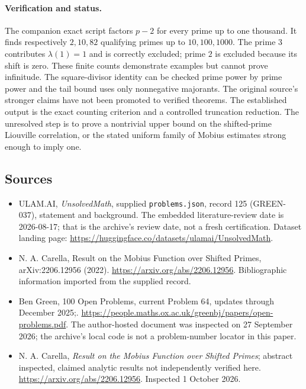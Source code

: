 \documentclass[11pt,a4paper]{article}
\begin{document}
\paragraph{Verification and status.}
The companion exact script factors $p-2$ for every prime up to one thousand. It finds respectively $2,10,82$ qualifying primes up to $10,100,1000$. The prime $3$ contributes $\lambda(1)=1$ and is correctly excluded; prime $2$ is excluded because its shift is zero. These finite counts demonstrate examples but cannot prove infinitude. The square-divisor identity can be checked prime power by prime power and the tail bound uses only nonnegative majorants. The original source's stronger claims have not been promoted to verified theorems. The established output is the exact counting criterion and a controlled truncation reduction. The unresolved step is to prove a nontrivial upper bound on the shifted-prime Liouville correlation, or the stated uniform family of Mobius estimates strong enough to imply one.

\subsection{Sources}

{\small

\begin{itemize}

\item[\hypertarget{source:125:1}{S1}] ULAM.AI, \emph{UnsolvedMath}, supplied \texttt{problems.json}, record 125 (GREEN-037), statement and background. The embedded literature-review date is 2026-08-17; that is the archive’s review date, not a fresh certification. Dataset landing page: \url{https://huggingface.co/datasets/ulamai/UnsolvedMath}.

\item[\hypertarget{source:125:2}{S2}] N. A. Carella, Result on the Mobius Function over Shifted Primes, arXiv:2206.12956 (2022). \url{https://arxiv.org/abs/2206.12956}. Bibliographic information imported from the supplied record.

\item[\hypertarget{source:125:3}{S3}] Ben Green, 100 Open Problems, current Problem 64, updates through December 2025;. \url{https://people.maths.ox.ac.uk/greenbj/papers/open-problems.pdf}. The author-hosted document was inspected on 27 September 2026; the archive’s local code is not a problem-number locator in this paper.

\item[E1] N. A. Carella, \emph{Result on the Mobius Function over Shifted Primes}; abstract inspected, claimed analytic results not independently verified here. \url{https://arxiv.org/abs/2206.12956}. Inspected 1 October 2026.

\end{itemize}

}

\label{end:125}
\end{document}
